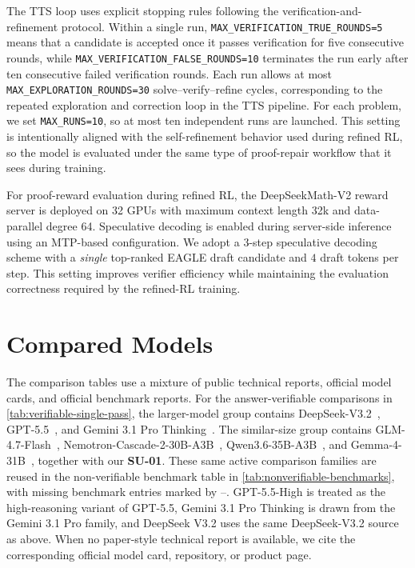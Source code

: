 The TTS loop uses explicit stopping rules following the verification-and-refinement protocol. Within a single run, \texttt{MAX\_VERIFICATION\_TRUE\_ROUNDS=5} means that a candidate is accepted once it passes verification for five consecutive rounds, while \texttt{MAX\_VERIFICATION\_FALSE\_ROUNDS=10} terminates the run early after ten consecutive failed verification rounds. Each run allows at most \texttt{MAX\_EXPLORATION\_ROUNDS=30} solve--verify--refine cycles, corresponding to the repeated exploration and correction loop in the TTS pipeline. For each problem, we set \texttt{MAX\_RUNS=10}, so at most ten independent runs are launched. This setting is intentionally aligned with the self-refinement behavior used during refined RL, so the model is evaluated under the same type of proof-repair workflow that it sees during training.

For proof-reward evaluation during refined RL, the DeepSeekMath-V2 reward server is deployed on 32 GPUs with maximum context length 32k and data-parallel degree 64. 
Speculative decoding is enabled during server-side inference using an MTP-based configuration. We adopt a $3$-step speculative decoding scheme with a \textit{single} top-ranked EAGLE draft candidate and $4$ draft tokens per step. This setting improves verifier efficiency while maintaining the evaluation correctness required by the refined-RL training.


\section{Compared Models}
\label{app:compared-models}

The comparison tables use a mixture of public technical reports, official model
cards, and official benchmark reports. For the answer-verifiable comparisons in
\cref{tab:verifiable-single-pass}, the larger-model group contains
DeepSeek-V3.2~\citep{deepseekai2025deepseekv32}, GPT-5.5~\citep{openai2026gpt55},
and Gemini 3.1 Pro Thinking~\citep{googledeepmind2026gemini31pro}. The
similar-size group contains GLM-4.7-Flash~\citep{zai2026glm47flash},
Nemotron-Cascade-2-30B-A3B~\citep{yang2026nemotroncascade2},
Qwen3.6-35B-A3B~\citep{qwen2026qwen36_35b}, and
Gemma-4-31B~\citep{google2026gemma4_31b}, together with our
\textbf{SU-01}. These same active comparison families are reused in the
non-verifiable benchmark table in \cref{tab:nonverifiable-benchmarks}, with
missing benchmark entries marked by --. GPT-5.5-High is treated as the
high-reasoning variant of GPT-5.5, Gemini 3.1 Pro Thinking is drawn from the
Gemini 3.1 Pro family, and DeepSeek V3.2 uses the same DeepSeek-V3.2 source as
above. When no paper-style technical report is available, we cite the
corresponding official model card, repository, or product page.

